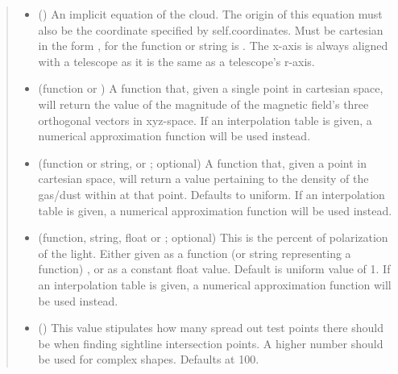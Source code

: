 \documentclass[letterpaper,10pt,english]{sphinxmanual}
\begin{document}
\begin{fulllineitems}
\begin{fulllineitems}
\begin{quote}
\begin{description}
\begin{itemize}
\item {} 
 (\sphinxstyleliteralemphasis{\sphinxupquote{,}}) \textendash{} An implicit equation of the cloud. The origin of this equation
must also be the coordinate specified by self.coordinates. Must
be cartesian in the form , for the function or
string is . The x-axis is always aligned with a
telescope as it is the same as a telescope’s r-axis.

\item {} 
 (function or {\hyperref[\detokenize{data_systematization:data_systematization.InterpolationTable}]{}}) \textendash{} A function that, given a single point in cartesian space, will
return the value of the magnitude of the magnetic field’s three
orthogonal vectors in xyz-space. If an interpolation table is
given, a numerical approximation function will be used instead.

\item {} 
 (function or string, or {\hyperref[\detokenize{data_systematization:data_systematization.InterpolationTable}]{}}; optional) \textendash{} A function that, given a point in cartesian space, will return
a value pertaining to the density of the gas/dust within at that
point. Defaults to uniform. If an interpolation table is
given, a numerical approximation function will be used instead.

\item {} 
 (function, string, float or {\hyperref[\detokenize{data_systematization:data_systematization.InterpolationTable}]{}}; optional) \textendash{} This is the percent of polarization of the light. Either given as
a function (or string representing a function) , or
as a constant float value. Default is uniform value of 1. If an
interpolation table is given, a numerical approximation function
will be used instead.

\item {} 
 () \textendash{} This value stipulates how many spread out test points there should
be when finding sightline intersection points. A higher number
should be used for complex shapes. Defaults at 100.


\end{itemize}
\end{description}
\end{quote}
\end{fulllineitems}
\end{fulllineitems}
\end{document}
